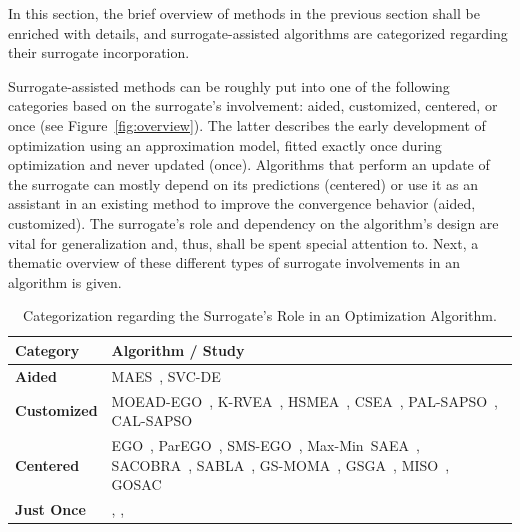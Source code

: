 \documentclass[journal]{IEEEtran}
\begin{document}
In this section, the brief overview of methods in the previous section shall be enriched with details, and surrogate-assisted algorithms are categorized regarding their surrogate incorporation.

Surrogate-assisted methods can be roughly put into one of the following categories based on the surrogate's involvement: aided, customized, centered, or once (see Figure~\ref{fig:overview}). The latter describes the early development of optimization using an approximation model, fitted exactly once during optimization and never updated (once).
Algorithms that perform an update of the surrogate can mostly depend on its predictions (centered) or use it as an assistant in an existing method to improve the convergence behavior (aided, customized). The surrogate's role and dependency on the algorithm's design are vital for generalization and, thus, shall be spent special attention to.
Next, a thematic overview of these different types of surrogate involvements in an algorithm is given.

\begin{table}[b]
\renewcommand{\arraystretch}{1.2}
\label{tbl:category}
\caption{Categorization regarding the Surrogate's Role in an Optimization Algorithm.}
\centering
\begin{tabular}{p{1.3cm} | p{6cm}}
\toprule
\textbf{Category} & \textbf{Algorithm / Study} \\ \midrule
 \textbf{Aided} & MAES~\cite{2002-emmerich-preselection}, SVC-DE~\cite{2011-lu-de-classification}\\ \hline
 \textbf{Customized} &
 MOEAD-EGO~\cite{2010-zhang-moead-ego},
 K-RVEA~\cite{2016-chugh-krvea},
 HSMEA~\cite{2019-habib-hsmea},
 CSEA~\cite{2019-pan-csea},
 PAL-SAPSO~\cite{2019-lv-surr-pso},
 CAL-SAPSO~\cite{2017-wang-pso-committee-active-learning}\\ \hline
 \textbf{Centered} &  EGO~\cite{1998-jones-ego},
 ParEGO~\cite{2006-knowles-parego},
 SMS-EGO~\cite{2008-ponweiser-sms-ego},
 Max-Min~SAEA~\cite{2006-ong-max-min},
 SACOBRA~\cite{2017-bagheri-sacobra},
 SABLA~\cite{2017-islam-sabla-bilevel},
 GS-MOMA~\cite{2010-lim-generalizing},
 GSGA~\cite{2020-cai-generalied-high-dim},
 MISO~\cite{2016-mueller-miso},
 GOSAC~\cite{2017-mueller-gosac}
 \\ \hline
 \textbf{Just Once} &  \cite{2014-lei-level-design}, \cite{2013-duan-emd}, \cite{2006-dorica-electromagnitic-neural} \\ \hline
\end{tabular}

\end{table}
\end{document}
